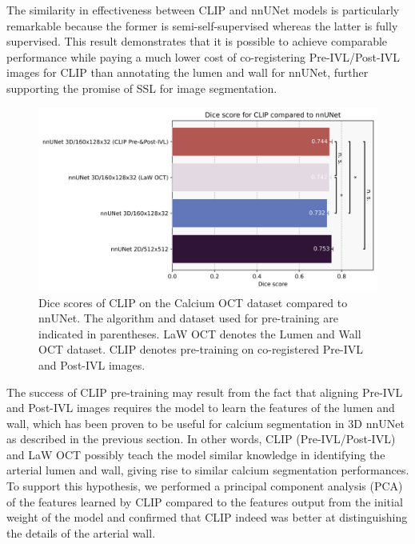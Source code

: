 \documentclass[a4paper,11pt,oneside]{report}
\begin{document}
The similarity in effectiveness between CLIP and nnUNet models is particularly remarkable because the former is semi-self-supervised whereas the latter is fully supervised. This result demonstrates that it is possible to achieve comparable performance while paying a much lower cost of co-registering Pre-IVL/Post-IVL images for CLIP than annotating the lumen and wall for nnUNet, further supporting the promise of SSL for image segmentation.%

\begin{figure}[h]
    \centering
    \includegraphics[width=0.65\linewidth]{figures/result_nnUNet_and_CLIP_results.png}
    \caption{Dice scores of CLIP on the Calcium OCT dataset compared to nnUNet. The algorithm and dataset used for pre-training are indicated in parentheses. LaW OCT denotes the Lumen and Wall OCT dataset. CLIP denotes pre-training on co-registered Pre-IVL and Post-IVL images.
    }
    \label{fig:clip-results}
\end{figure}

The success of CLIP pre-training may result from the fact that aligning Pre-IVL and Post-IVL images requires the model to learn the features of the lumen and wall, which has been proven to be useful for calcium segmentation in 3D nnUNet as described in the previous section. In other words, CLIP (Pre-IVL/Post-IVL) and LaW OCT possibly teach the model similar knowledge in identifying the arterial lumen and wall, giving rise to similar calcium segmentation performances. To support this hypothesis, we performed a principal component analysis (PCA) of the features learned by CLIP compared to the features output from the initial weight of the model and confirmed that CLIP indeed was better at distinguishing the details of the arterial wall.
\end{document}
